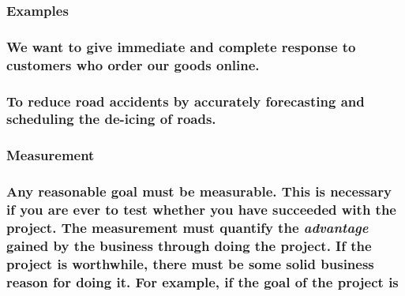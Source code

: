\documentclass[
]{article}
\begin{document}
\hypertarget{examples}{%
\subsubsection{Examples}\label{examples}}

\hypertarget{we-want-to-give-immediate-and-complete-response-to-customers-who-order-our-goods-online.}{%
\subsubsection{\texorpdfstring{We want to give immediate and complete
response to customers who order our goods online.
}{We want to give immediate and complete response to customers who order our goods online. }}\label{we-want-to-give-immediate-and-complete-response-to-customers-who-order-our-goods-online.}}

\hypertarget{to-reduce-road-accidents-by-accurately-forecasting-and-scheduling-the-de-icing-of-roads.}{%
\subsubsection{To reduce road accidents by accurately forecasting and
scheduling the de-icing of
roads.}\label{to-reduce-road-accidents-by-accurately-forecasting-and-scheduling-the-de-icing-of-roads.}}

\hypertarget{measurement}{%
\subsubsection{\texorpdfstring{Measurement
}{Measurement }}\label{measurement}}

\hypertarget{any-reasonable-goal-must-be-measurable.-this-is-necessary-if-you-are-ever-to-test-whether-you-have-succeeded-with-the-project.-the-measurement-must-quantify-the-advantage-gained-by-the-business-through-doing-the-project.-if-the-project-is-worthwhile-there-must-be-some-solid-business-reason-for-doing-it.-for-example-if-the-goal-of-the-project-is}{%
\subsubsection{\texorpdfstring{Any reasonable goal must be measurable.
This is necessary if you are ever to test whether you have succeeded
with the project. The measurement must quantify the \emph{advantage}
gained by the business through doing the project. If the project is
worthwhile, there must be some solid business reason for doing it. For
example, if the goal of the project is
}{Any reasonable goal must be measurable. This is necessary if you are ever to test whether you have succeeded with the project. The measurement must quantify the advantage gained by the business through doing the project. If the project is worthwhile, there must be some solid business reason for doing it. For example, if the goal of the project is }}\label{any-reasonable-goal-must-be-measurable.-this-is-necessary-if-you-are-ever-to-test-whether-you-have-succeeded-with-the-project.-the-measurement-must-quantify-the-advantage-gained-by-the-business-through-doing-the-project.-if-the-project-is-worthwhile-there-must-be-some-solid-business-reason-for-doing-it.-for-example-if-the-goal-of-the-project-is}}
\end{document}
